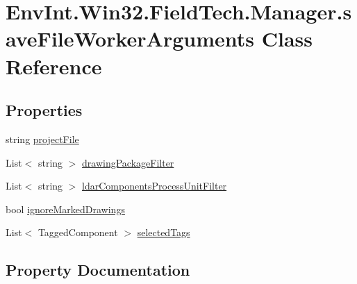 \hypertarget{class_env_int_1_1_win32_1_1_field_tech_1_1_manager_1_1save_file_worker_arguments}{}\section{Env\+Int.\+Win32.\+Field\+Tech.\+Manager.\+save\+File\+Worker\+Arguments Class Reference}
\label{class_env_int_1_1_win32_1_1_field_tech_1_1_manager_1_1save_file_worker_arguments}
\subsection*{Properties}
\begin{DoxyCompactItemize}
\item 
string \hyperlink{class_env_int_1_1_win32_1_1_field_tech_1_1_manager_1_1save_file_worker_arguments_a789eaf667d1c6a1d6d26b38e38618551}{project\+File}
\item 
List$<$ string $>$ \hyperlink{class_env_int_1_1_win32_1_1_field_tech_1_1_manager_1_1save_file_worker_arguments_a684e1a4a1c4c729e900b507b56475ecb}{drawing\+Package\+Filter}
\item 
List$<$ string $>$ \hyperlink{class_env_int_1_1_win32_1_1_field_tech_1_1_manager_1_1save_file_worker_arguments_a00b50594c98505075f2e22e3cd930be0}{ldar\+Components\+Process\+Unit\+Filter}
\item 
bool \hyperlink{class_env_int_1_1_win32_1_1_field_tech_1_1_manager_1_1save_file_worker_arguments_abe8a90343c3c0513d0f2e010e7aad9c6}{ignore\+Marked\+Drawings}
\item 
List$<$ Tagged\+Component $>$ \hyperlink{class_env_int_1_1_win32_1_1_field_tech_1_1_manager_1_1save_file_worker_arguments_a5f9698f03ccd644ebc76232f58d9e1df}{selected\+Tags}
\end{DoxyCompactItemize}


\subsection{Property Documentation}
\hypertarget{class_env_int_1_1_win32_1_1_field_tech_1_1_manager_1_1save_file_worker_arguments_a684e1a4a1c4c729e900b507b56475ecb}{}

